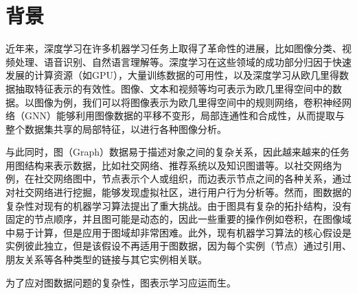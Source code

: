 \section{背景}
近年来，深度学习在许多机器学习任务上取得了革命性的进展，比如图像分类、视频处理、语音识别、自然语言理解等。深度学习在这些领域的成功部分归因于快速发展的计算资源（如GPU），大量训练数据的可用性，以及深度学习从欧几里得数据抽取特征表示的有效性。图像、文本和视频等均可表示为欧几里得空间中的数据。以图像为例，我们可以将图像表示为欧几里得空间中的规则网络，卷积神经网络（GNN）\cite{NIPS2012_4824}能够利用图像数据的平移不变形，局部连通性和合成性，从而提取与整个数据集共享的局部特征，以进行各种图像分析。

与此同时，图（Graph）数据易于描述对象之间的复杂关系，因此越来越来的任务用图结构来表示数据，比如社交网络、推荐系统以及知识图谱等。以社交网络为例，在社交网络图中，节点表示个人或组织，而边表示节点之间的各种关系，通过对社交网络进行挖掘，能够发现虚拟社区，进行用户行为分析等。然而，图数据的复杂性对现有的机器学习算法提出了重大挑战。由于图具有复杂的拓扑结构，没有固定的节点顺序，并且图可能是动态的，因此一些重要的操作例如卷积，在图像域中易于计算，但是应用于图域却非常困难。此外，现有机器学习算法的核心假设是实例彼此独立，但是该假设不再适用于图数据，因为每个实例（节点）通过引用、朋友关系等各种类型的链接与其它实例相关联。

为了应对图数据问题的复杂性，图表示学习应运而生。
